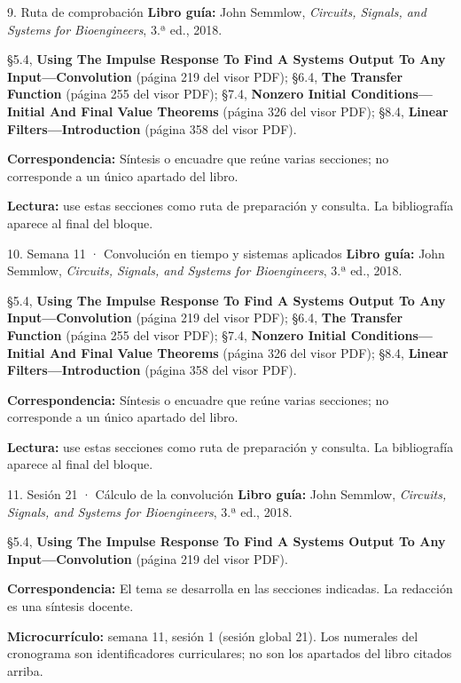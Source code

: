 \documentclass[
  10pt,
  ignorenonframetext,
  aspectratio=169,
  spanish,
]{beamer}
\begin{document}
\begin{frame}{9. Ruta de comprobación}
\label{ruta-de-comprobaciuxf3n}
\textbf{Libro guía:} John Semmlow, \emph{Circuits, Signals, and Systems
for Bioengineers}, 3.ª ed., 2018.

§5.4, \textbf{Using The Impulse Response To Find A Systems Output To Any
Input---Convolution} (página 219 del visor PDF); §6.4, \textbf{The
Transfer Function} (página 255 del visor PDF); §7.4, \textbf{Nonzero
Initial Conditions---Initial And Final Value Theorems} (página 326 del
visor PDF); §8.4, \textbf{Linear Filters---Introduction} (página 358 del
visor PDF).

\textbf{Correspondencia:} Síntesis o encuadre que reúne varias
secciones; no corresponde a un único apartado del libro.

\textbf{Lectura:} use estas secciones como ruta de preparación y
consulta. La bibliografía aparece al final del bloque.
\end{frame}

\begin{frame}{10. Semana 11 · Convolución en tiempo y sistemas
aplicados}
\label{semana-11-convoluciuxf3n-en-tiempo-y-sistemas-aplicados}
\textbf{Libro guía:} John Semmlow, \emph{Circuits, Signals, and Systems
for Bioengineers}, 3.ª ed., 2018.

§5.4, \textbf{Using The Impulse Response To Find A Systems Output To Any
Input---Convolution} (página 219 del visor PDF); §6.4, \textbf{The
Transfer Function} (página 255 del visor PDF); §7.4, \textbf{Nonzero
Initial Conditions---Initial And Final Value Theorems} (página 326 del
visor PDF); §8.4, \textbf{Linear Filters---Introduction} (página 358 del
visor PDF).

\textbf{Correspondencia:} Síntesis o encuadre que reúne varias
secciones; no corresponde a un único apartado del libro.

\textbf{Lectura:} use estas secciones como ruta de preparación y
consulta. La bibliografía aparece al final del bloque.
\end{frame}

\begin{frame}{11. Sesión 21 · Cálculo de la convolución}
\label{sesiuxf3n-21-cuxe1lculo-de-la-convoluciuxf3n}
\textbf{Libro guía:} John Semmlow, \emph{Circuits, Signals, and Systems
for Bioengineers}, 3.ª ed., 2018.

§5.4, \textbf{Using The Impulse Response To Find A Systems Output To Any
Input---Convolution} (página 219 del visor PDF).

\textbf{Correspondencia:} El tema se desarrolla en las secciones
indicadas. La redacción es una síntesis docente.

\textbf{Microcurrículo:} semana 11, sesión 1 (sesión global 21). Los
numerales del cronograma son identificadores curriculares; no son los
apartados del libro citados arriba.
\end{frame}
\end{document}

